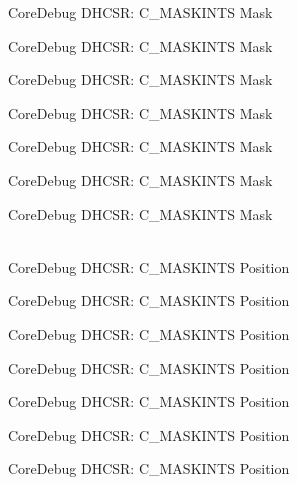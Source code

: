 \begin{DoxyRefList}
\label{deprecated__deprecated000122}%
%
Core\+Debug DHCSR:\+ C\+\_\+\+MASKINTS Mask 

\label{deprecated__deprecated000178}%
%
Core\+Debug DHCSR:\+ C\+\_\+\+MASKINTS Mask 

\label{deprecated__deprecated000261}%
%
Core\+Debug DHCSR:\+ C\+\_\+\+MASKINTS Mask 

\label{deprecated__deprecated000320}%
%
Core\+Debug DHCSR:\+ C\+\_\+\+MASKINTS Mask 

\label{deprecated__deprecated000396}%
%
Core\+Debug DHCSR:\+ C\+\_\+\+MASKINTS Mask 

\label{deprecated__deprecated000485}%
%
Core\+Debug DHCSR:\+ C\+\_\+\+MASKINTS Mask 

\label{deprecated__deprecated000587}%
%
Core\+Debug DHCSR:\+ C\+\_\+\+MASKINTS Mask  
\item[{\parbox[t]{\linewidth}{Global \doxylink{group__CMSIS__CoreDebug_ga0d2907400eb948a4ea3886ca083ec8e3}{Core\+Debug\+\_\+\+DHCSR\+\_\+\+C\+\_\+\+MASKINTS\+\_\+\+Pos} }}]\hfill \\
\label{deprecated__deprecated000033}%
%
Core\+Debug DHCSR:\+ C\+\_\+\+MASKINTS Position 

\label{deprecated__deprecated000121}%
%
Core\+Debug DHCSR:\+ C\+\_\+\+MASKINTS Position 

\label{deprecated__deprecated000177}%
%
Core\+Debug DHCSR:\+ C\+\_\+\+MASKINTS Position 

\label{deprecated__deprecated000260}%
%
Core\+Debug DHCSR:\+ C\+\_\+\+MASKINTS Position 

\label{deprecated__deprecated000319}%
%
Core\+Debug DHCSR:\+ C\+\_\+\+MASKINTS Position 

\label{deprecated__deprecated000395}%
%
Core\+Debug DHCSR:\+ C\+\_\+\+MASKINTS Position 

\label{deprecated__deprecated000484}%
%
Core\+Debug DHCSR:\+ C\+\_\+\+MASKINTS Position 


\end{DoxyRefList}
